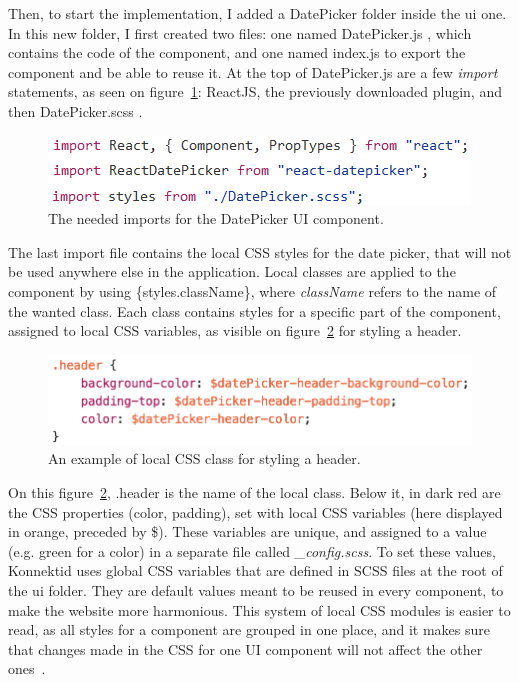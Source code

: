 Then, to start the implementation, I added a \guillemotleft{} DatePicker \guillemotright{} folder inside the ui one. In this new folder, I first created two files: one named \guillemotleft{} DatePicker.js \guillemotright{}, which contains the code of the component, and one named \guillemotleft{} index.js \guillemotright{} to export the component and be able to reuse it. At the top of DatePicker.js are a few \textit{import} statements, as seen on {\sc figure}~\ref{fig:imports}: ReactJS, the previously downloaded plugin, and then \guillemotleft{} DatePicker.scss \guillemotright{}.

\begin{figure}[H]
    \centering
    \includegraphics[scale=0.9]{figure/imports.png}
    \caption{The needed imports for the DatePicker UI component.}
    \label{fig:imports}
\end{figure}

The last import file contains the local CSS styles for the date picker, that will not be used anywhere else in the application. Local classes are applied to the component by using \{styles.className\}, where \textit{className} refers to the name of the wanted class. Each class contains styles for a specific part of the component, assigned to local CSS variables, as visible on {\sc figure}~\ref{fig:cssClass} for styling a header.

\begin{figure}[H]
    \centering
    \includegraphics[scale=0.9]{figure/cssClass.png}
    \caption{An example of local CSS class for styling a header.}
    \label{fig:cssClass}
\end{figure}

On this {\sc figure}~\ref{fig:cssClass}, \guillemotleft{} .header \guillemotright{} is the name of the local class. Below it, in dark red are the CSS properties (color, padding\ldos), set with local CSS variables (here displayed in orange, preceded by \$). These variables are unique, and assigned to a value (e.g. \guillemotleft{} green \guillemotright{} for a color) in a separate file called \textit{_config.scss}.
To set these values, Konnektid uses global CSS variables that are defined in SCSS files at the root of the ui folder. They are default values meant to be reused in every component, to make the website more harmonious.
This system of local CSS modules is easier to read, as all styles for a component are grouped in one place, and it makes sure that changes made in the CSS for one UI component will not affect the other ones~\cite{localCSS}.

